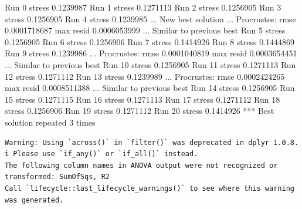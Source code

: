 \documentclass[
]{book}
\newenvironment{Shaded}{\begin{snugshade}}{\end{snugshade}}
\newcommand{\NormalTok}[1]{#1}
\begin{document}
\begin{Shaded}
\begin{Highlighting}[]
\NormalTok{Run 0 stress 0.1239987 }
\NormalTok{Run 1 stress 0.1271113 }
\NormalTok{Run 2 stress 0.1256905 }
\NormalTok{Run 3 stress 0.1256905 }
\NormalTok{Run 4 stress 0.1239985 }
\NormalTok{... New best solution}
\NormalTok{... Procrustes: rmse 0.0001718687  max resid 0.0006053999 }
\NormalTok{... Similar to previous best}
\NormalTok{Run 5 stress 0.1256905 }
\NormalTok{Run 6 stress 0.1256906 }
\NormalTok{Run 7 stress 0.1414926 }
\NormalTok{Run 8 stress 0.1444869 }
\NormalTok{Run 9 stress 0.1239986 }
\NormalTok{... Procrustes: rmse 0.0001040819  max resid 0.0003654451 }
\NormalTok{... Similar to previous best}
\NormalTok{Run 10 stress 0.1256905 }
\NormalTok{Run 11 stress 0.1271113 }
\NormalTok{Run 12 stress 0.1271112 }
\NormalTok{Run 13 stress 0.1239989 }
\NormalTok{... Procrustes: rmse 0.0002424265  max resid 0.0008511388 }
\NormalTok{... Similar to previous best}
\NormalTok{Run 14 stress 0.1256905 }
\NormalTok{Run 15 stress 0.1271115 }
\NormalTok{Run 16 stress 0.1271113 }
\NormalTok{Run 17 stress 0.1271112 }
\NormalTok{Run 18 stress 0.1256906 }
\NormalTok{Run 19 stress 0.1271112 }
\NormalTok{Run 20 stress 0.1414926 }
\NormalTok{*** Best solution repeated 3 times}
\end{Highlighting}
\end{Shaded}

\begin{verbatim}
Warning: Using `across()` in `filter()` was deprecated in dplyr 1.0.8.
i Please use `if_any()` or `if_all()` instead.
The following column names in ANOVA output were not recognized or transformed: SumOfSqs, R2
Call `lifecycle::last_lifecycle_warnings()` to see where this warning was generated.
\end{verbatim}
\end{document}
